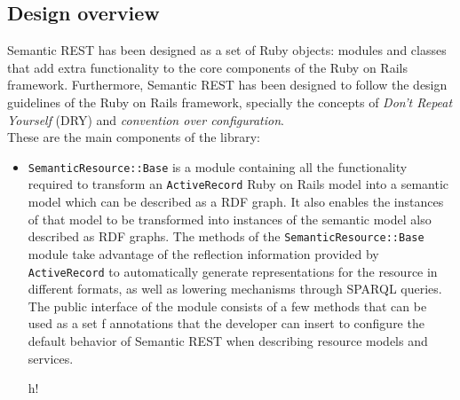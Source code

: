 \subsection{Design overview}

Semantic REST has been designed as a set of Ruby objects: modules and classes that add extra functionality to the core
components of the Ruby on Rails framework. Furthermore, Semantic REST has been designed to follow the design guidelines
of the Ruby on Rails framework, specially the concepts of {\it Don't Repeat Yourself} (DRY) and {\it convention over
  configuration}.\\

These are the main components of the library:

\begin{itemize}
\item \texttt{SemanticResource::Base} is a module containing all the functionality required to transform an
  \texttt{ActiveRecord} Ruby on Rails model into a semantic model which can be described as a RDF graph. It also enables
  the instances of that model to be transformed into instances of the semantic model also described as RDF graphs. The
  methods of the \texttt{SemanticResource::Base} module take advantage of the reflection information provided by
  \texttt{ActiveRecord} to automatically generate representations  for the resource in different formats, as well as
  lowering mechanisms through SPARQL queries. The public interface of the module consists of a few methods that can be
  used as a set f annotations that the developer can insert to configure the default behavior of Semantic REST when describing
  resource models and services.

\begin{table}{h!}
\noindent{}
\caption{Main architectural blocks of the Semantic REST library}
\end{table}



\end{itemize}
